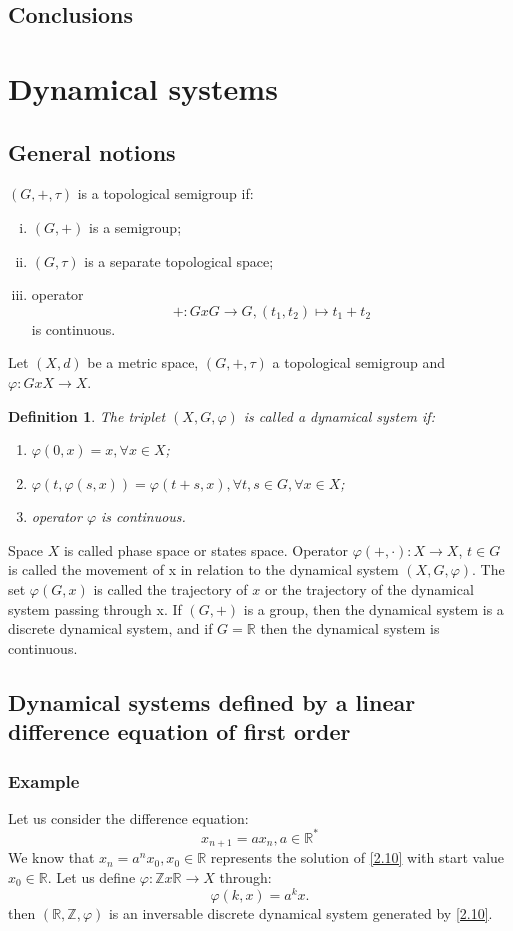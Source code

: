 \documentclass[a4paper,11pt]{report}
\newtheorem{definition}{Definition}[subsection]
\newcommand{\R}{\mathbb{R}}
\begin{document}
\subsection{Conclusions}

\section{Dynamical systems}
\subsection{General notions}
$(G,+,\tau)$ is a topological semigroup if:
\begin{enumerate}[i)]
 \item $(G,+)$ is a semigroup;
 \item $(G,\tau)$ is a separate topological space;
 \item operator 
 $$ +:GxG\rightarrow G, (t_{1},t_{2})\longmapsto t_{1}+t_{2}$$ is continuous.
\end{enumerate}
Let $(X,d)$ be a metric space, $(G,+,\tau)$ a topological semigroup and $\varphi : GxX\rightarrow X$.
\begin{definition}The triplet $(X,G,\varphi)$ is called a dynamical system if:
\begin{enumerate}
 \item $\varphi(0,x)=x, \forall x\in X$;
 \item $\varphi(t, \varphi(s,x))=\varphi(t+s,x), \forall t,s\in G, \forall x\in X$;
 \item operator $\varphi$ is continuous.
\end{enumerate}
\end{definition}
Space $X$ is called phase space or states space. Operator $\varphi(+,\cdot):X\rightarrow X$, $t\in G$ is called the movement of x in relation to the dynamical system $(X,G,\varphi)$. The set $\varphi(G,x)$ is called the trajectory of $x$ or the trajectory of the dynamical system passing through x. If $(G,+)$ is a group, then the dynamical system is a discrete dynamical system, and if $G=\R$ then the dynamical system is continuous.
\subsection{Dynamical systems defined by a linear difference equation of first order}
\subsubsection{Example}\label{2.2.2.1} Let us consider the difference equation:
\begin{equation}
 x_{n+1}=ax_{n}, a\in \R^{*} \label{2.10}
\end{equation}
We know that $x_{n}=a^{n}x_{0}, x_{0}\in\R$ represents the solution of \eqref{2.10} with start value $x_{0}\in\R$. Let us define $\varphi:\mathbb{Z}x\R\rightarrow X$ through:
$$\varphi(k,x)=a^{k}x.$$
then $(\R,\mathbb{Z},\varphi)$ is an inversable discrete dynamical system generated by \eqref{2.10}.
\end{document}
